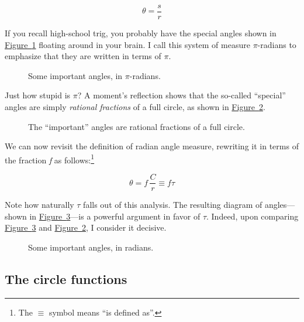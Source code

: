 \documentclass{article}
\begin{document}
\[ \theta = \frac{s}{r} \]

If you recall high-school trig, you probably have the special angles shown in \hyperref[fig:pi-angles]{Figure~}\ref{fig:pi-angles} floating around in your brain. I call this system of measure $\pi$-radians to emphasize that they are written in terms of $\pi$.

\begin{figure}
\begin{center}
\end{center}
\caption{Some important angles, in $\pi$-radians.\label{fig:pi-angles}}
\end{figure}

Just how stupid is $\pi$? A moment's reflection shows that the so-called ``special'' angles are simply  \emph{rational fractions} of a full circle, as shown in \hyperref[fig:angle-fractions]{Figure~}\ref{fig:angle-fractions}.

\begin{figure}
\begin{center}
\end{center}
\caption{The ``important'' angles are rational fractions of a full circle.\label{fig:angle-fractions}}
\end{figure}

\noindent We can now revisit the definition of radian angle measure, rewriting it in terms of the fraction \emph{f} as follows:\footnote{The $\equiv$ symbol means ``is defined as''.}

\[ \theta = f\,\frac{C}{r} \equiv f\tau \]

\noindent Note how naturally $\tau$ falls out of this analysis. The resulting diagram of angles---shown in \hyperref[fig:tau-angles]{Figure~}\ref{fig:tau-angles}---is a powerful argument in favor of $\tau$.
Indeed, upon comparing \hyperref[fig:tau-angles]{Figure~}\ref{fig:tau-angles} and \hyperref[fig:angle-fractions]{Figure~}\ref{fig:angle-fractions}, I consider it decisive.

\begin{figure}
\begin{center}
\end{center}
\caption{Some important angles, in radians.\label{fig:tau-angles}}
\end{figure}

  \subsection{The circle functions} %
  \label{sec:the_circle_functions}
\end{document}
